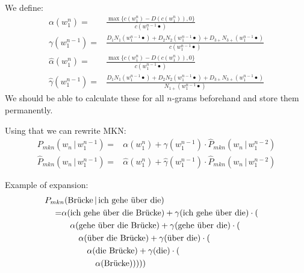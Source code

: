 \documentclass[11pt,a4paper]{article}
\newcommand\givenbase[1][]{\,#1\lvert\,}
\let\given\givenbase
\newcommand{\probSymbol}[1][]{P_{#1}}
\newcommand{\prob}[2][]{\probSymbol[#1](#2)}
\newcommand{\probCond}[3][]{\prob[#1]{#2 \given #3}}
\newcommand{\probSymbolLower}[1][]{\hat{P}_{#1}}
\newcommand{\probLower}[2][]{\probSymbolLower[#1](#2)}
\newcommand{\probCondLower}[3][]{\probLower[#1]{#2 \given #3}}
\begin{document}
We define:
\begin{align}
  \alpha(w_1^n)     =& \frac{\max{\{c(w_1^n) - D(c(w_1^n)), 0\}}}{c(w_1^{n-1} \bullet)} \\
  \gamma(w_1^{n-1}) =& \frac{  D_1    N_1   (w_1^{n-1} \bullet)
                           + D_2    N_2   (w_1^{n-1} \bullet)
                           + D_{3+} N_{3+}(w_1^{n-1} \bullet)}
                          {c(w_1^{n-1} \bullet)} \\
  \hat\alpha(w_1^n)     =& \frac{\max{\{c(w_1^n) - D(c(w_1^n)), 0\}}}{c(w_1^{n-1} \bullet)} \\
  \hat\gamma(w_1^{n-1}) =& \frac{  D_1    N_1   (w_1^{n-1} \bullet)
                           + D_2    N_2   (w_1^{n-1} \bullet)
                           + D_{3+} N_{3+}(w_1^{n-1} \bullet)}
                          {N_{1+}(w_1^{n-1} \bullet)}
\end{align}
We should be able to calculate these for all $n$-grams beforehand and store
them permanently.

Using that we can rewrite MKN:
\begin{align}
  \probCond[mkn]{w_n}{w_1^{n-1}}      =& \alpha(w_1^n) + \gamma(w_1^{n-1}) \cdot \probCondLower[mkn]{w_n}{w_1^{n-2}} \\
  \probCondLower[mkn]{w_n}{w_1^{n-1}} =& \hat\alpha(w_1^n) + \hat\gamma(w_1^{n-1}) \cdot \probCondLower[mkn]{w_n}{w_1^{n-2}}
\end{align}

Example of expansion:
\begin{equation}
  \begin{split}
    &\hspace{-2em}\probCond[mkn]{\text{Br\"ucke}}{\text{ich gehe \"uber die}}\\ =
      &\alpha(\text{ich gehe \"uber die Br\"ucke}) + \gamma(\text{ich gehe \"uber die}) \cdot (\\
        &\quad \alpha(\text{gehe \"uber die Br\"ucke}) + \gamma(\text{gehe \"uber die}) \cdot (\\
        &\quad\quad \alpha(\text{\"uber die Br\"ucke}) + \gamma(\text{\"uber die}) \cdot (\\
        &\quad\quad\quad \alpha(\text{die Br\"ucke}) + \gamma(\text{die}) \cdot (\\
        &\quad\quad\quad\quad \alpha(\text{Br\"ucke})))))
  \end{split}
\end{equation}
\end{document}
